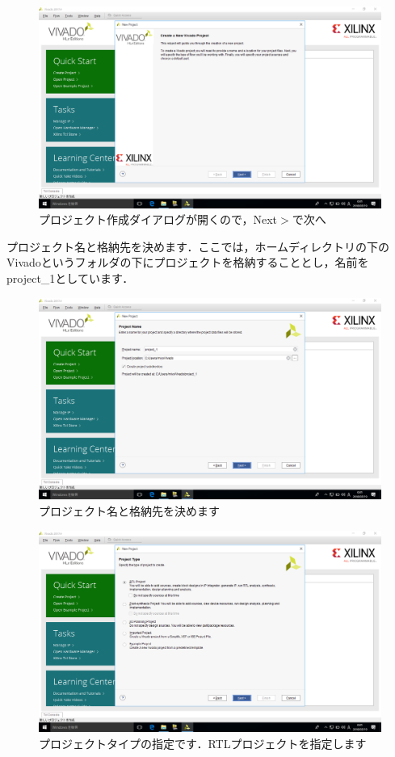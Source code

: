 \documentclass[a4paper,dvipdfmx]{jsarticle}
\begin{document}
 \begin{figure}[H]
  \begin{center}
   \includegraphics[width=.8\textwidth]{chapter03_figures/VirtualBox_Windows10_19_03_2018_00_01_32.png}
  \end{center}
  \caption{プロジェクト作成ダイアログが開くので，Next$\gt$で次へ}
 \end{figure}

プロジェクト名と格納先を決めます．ここでは，ホームディレクトリの下のVivadoというフォルダの下にプロジェクトを格納することとし，名前をproject\_1としています．
 \begin{figure}[H]
  \begin{center}
   \includegraphics[width=.8\textwidth]{chapter03_figures/VirtualBox_Windows10_19_03_2018_00_01_37.png}
  \end{center}
  \caption{プロジェクト名と格納先を決めます}
 \end{figure}

 \begin{figure}[H]
  \begin{center}
   \includegraphics[width=.8\textwidth]{chapter03_figures/VirtualBox_Windows10_19_03_2018_00_01_43.png}
  \end{center}
  \caption{プロジェクトタイプの指定です．RTLプロジェクトを指定します}
 \end{figure}
\end{document}
